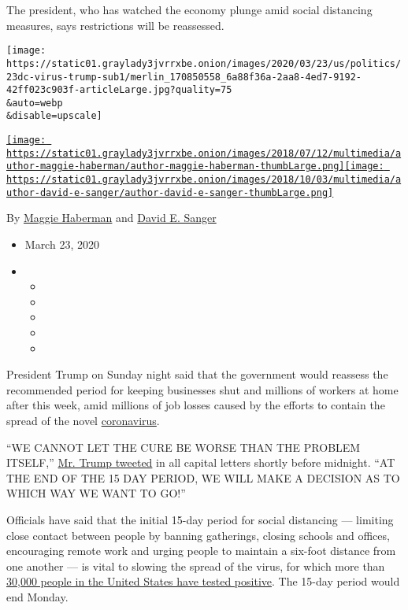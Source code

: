 The president, who has watched the economy plunge amid social distancing
measures, says restrictions will be reassessed.

\texttt{[image: https://static01.graylady3jvrrxbe.onion/images/2020/03/23/us/politics/23dc-virus-trump-sub1/merlin\_170850558\_6a88f36a-2aa8-4ed7-9192-42ff023c903f-articleLarge.jpg?quality=75\\\&auto=webp\\\&disable=upscale]}

\href{https://www.nytimes3xbfgragh.onion/by/maggie-haberman}{\texttt{[image: https://static01.graylady3jvrrxbe.onion/images/2018/07/12/multimedia/author-maggie-haberman/author-maggie-haberman-thumbLarge.png]}}\href{https://www.nytimes3xbfgragh.onion/by/david-e-sanger}{\texttt{[image: https://static01.graylady3jvrrxbe.onion/images/2018/10/03/multimedia/author-david-e-sanger/author-david-e-sanger-thumbLarge.png]}}

By \href{https://www.nytimes3xbfgragh.onion/by/maggie-haberman}{Maggie
Haberman} and
\href{https://www.nytimes3xbfgragh.onion/by/david-e-sanger}{David E.
Sanger}

\begin{itemize}
\item
  March 23, 2020
\item
  \begin{itemize}
  \item
  \item
  \item
  \item
  \item
  \end{itemize}
\end{itemize}

President Trump on Sunday night said that the government would reassess
the recommended period for keeping businesses shut and millions of
workers at home after this week, amid millions of job losses caused by
the efforts to contain the spread of the novel
\href{https://www.nytimes3xbfgragh.onion/2020/03/23/world/coronavirus-news.html}{coronavirus}.

``WE CANNOT LET THE CURE BE WORSE THAN THE PROBLEM ITSELF,''
\href{https://twitter.com/realDonaldTrump/status/1241935285916782593}{Mr.
Trump tweeted} in all capital letters shortly before midnight. ``AT THE
END OF THE 15 DAY PERIOD, WE WILL MAKE A DECISION AS TO WHICH WAY WE
WANT TO GO!''

Officials have said that the initial 15-day period for social distancing
--- limiting close contact between people by banning gatherings, closing
schools and offices, encouraging remote work and urging people to
maintain a six-foot distance from one another --- is vital to slowing
the spread of the virus, for which more than
\href{https://www.nytimes3xbfgragh.onion/interactive/2020/us/coronavirus-us-cases.html}{30,000
people in the United States have tested positive}. The 15-day period
would end Monday.

